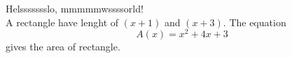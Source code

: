 \documentclass[11pt]{article}
\begin{document}
    Helssssssslo, mmmmmwssssorld!\\
    
    A rectangle have lenght of $(x+1)$ and $(x+3)$. The equation $${A(x)=x^2+4x+3}$$ gives the
    area of rectangle.
\end{document}
